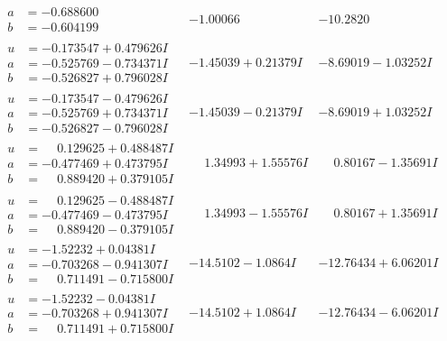 \documentclass[1p]{elsarticle_modified}
\theoremstyle{definition}
\begin{document}
$$\begin{array}{c|c|c}
\begin{aligned}
a &= -0.688600\phantom{ +0.000000I} \\
b &= -0.604199\phantom{ +0.000000I}\end{aligned}
 & -1.00066\phantom{ +0.000000I} & -10.2820\phantom{ +0.000000I} \\ \hline\begin{aligned}
u &= -0.173547 + 0.479626 I \\
a &= -0.525769 - 0.734371 I \\
b &= -0.526827 + 0.796028 I\end{aligned}
 & -1.45039 + 0.21379 I & -8.69019 - 1.03252 I \\ \hline\begin{aligned}
u &= -0.173547 - 0.479626 I \\
a &= -0.525769 + 0.734371 I \\
b &= -0.526827 - 0.796028 I\end{aligned}
 & -1.45039 - 0.21379 I & -8.69019 + 1.03252 I \\ \hline\begin{aligned}
u &= \phantom{-}0.129625 + 0.488487 I \\
a &= -0.477469 + 0.473795 I \\
b &= \phantom{-}0.889420 + 0.379105 I\end{aligned}
 & \phantom{-}1.34993 + 1.55576 I & \phantom{-}0.80167 - 1.35691 I \\ \hline\begin{aligned}
u &= \phantom{-}0.129625 - 0.488487 I \\
a &= -0.477469 - 0.473795 I \\
b &= \phantom{-}0.889420 - 0.379105 I\end{aligned}
 & \phantom{-}1.34993 - 1.55576 I & \phantom{-}0.80167 + 1.35691 I \\ \hline\begin{aligned}
u &= -1.52232 + 0.04381 I \\
a &= -0.703268 - 0.941307 I \\
b &= \phantom{-}0.711491 - 0.715800 I\end{aligned}
 & -14.5102 - 1.0864 I & -12.76434 + 6.06201 I \\ \hline\begin{aligned}
u &= -1.52232 - 0.04381 I \\
a &= -0.703268 + 0.941307 I \\
b &= \phantom{-}0.711491 + 0.715800 I\end{aligned}
 & -14.5102 + 1.0864 I & -12.76434 - 6.06201 I \\ \hline\begin{aligned}

\end{aligned}
\end{array}$$
\end{document}
